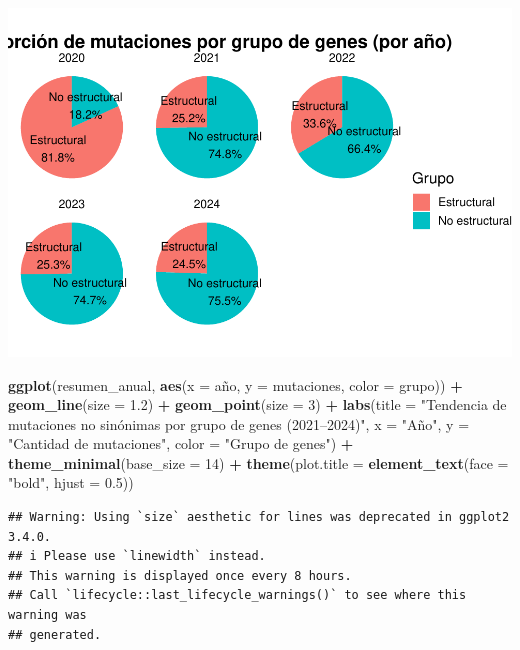 \documentclass[
]{article}
\newenvironment{Shaded}{\begin{snugshade}}{\end{snugshade}}
\newcommand{\AttributeTok}[1]{\textcolor[rgb]{0.13,0.29,0.53}{#1}}
\newcommand{\DecValTok}[1]{\textcolor[rgb]{0.00,0.00,0.81}{#1}}
\newcommand{\FloatTok}[1]{\textcolor[rgb]{0.00,0.00,0.81}{#1}}
\newcommand{\FunctionTok}[1]{\textcolor[rgb]{0.13,0.29,0.53}{\textbf{#1}}}
\newcommand{\NormalTok}[1]{#1}
\newcommand{\SpecialCharTok}[1]{\textcolor[rgb]{0.81,0.36,0.00}{\textbf{#1}}}
\newcommand{\StringTok}[1]{\textcolor[rgb]{0.31,0.60,0.02}{#1}}
\begin{document}
\includegraphics{situacion_problema_files/figure-latex/unnamed-chunk-7-1.pdf}

\begin{Shaded}
\begin{Highlighting}[]
\FunctionTok{ggplot}\NormalTok{(resumen\_anual, }\FunctionTok{aes}\NormalTok{(}\AttributeTok{x =}\NormalTok{ año, }\AttributeTok{y =}\NormalTok{ mutaciones, }\AttributeTok{color =}\NormalTok{ grupo)) }\SpecialCharTok{+}
  \FunctionTok{geom\_line}\NormalTok{(}\AttributeTok{size =} \FloatTok{1.2}\NormalTok{) }\SpecialCharTok{+}
  \FunctionTok{geom\_point}\NormalTok{(}\AttributeTok{size =} \DecValTok{3}\NormalTok{) }\SpecialCharTok{+}
  \FunctionTok{labs}\NormalTok{(}\AttributeTok{title =} \StringTok{"Tendencia de mutaciones no sinónimas por grupo de genes (2021–2024)"}\NormalTok{,}
       \AttributeTok{x =} \StringTok{"Año"}\NormalTok{, }\AttributeTok{y =} \StringTok{"Cantidad de mutaciones"}\NormalTok{, }\AttributeTok{color =} \StringTok{"Grupo de genes"}\NormalTok{) }\SpecialCharTok{+}
  \FunctionTok{theme\_minimal}\NormalTok{(}\AttributeTok{base\_size =} \DecValTok{14}\NormalTok{) }\SpecialCharTok{+}
  \FunctionTok{theme}\NormalTok{(}\AttributeTok{plot.title =} \FunctionTok{element\_text}\NormalTok{(}\AttributeTok{face =} \StringTok{"bold"}\NormalTok{, }\AttributeTok{hjust =} \FloatTok{0.5}\NormalTok{))}
\end{Highlighting}
\end{Shaded}

\begin{verbatim}
## Warning: Using `size` aesthetic for lines was deprecated in ggplot2 3.4.0.
## i Please use `linewidth` instead.
## This warning is displayed once every 8 hours.
## Call `lifecycle::last_lifecycle_warnings()` to see where this warning was
## generated.
\end{verbatim}
\end{document}
